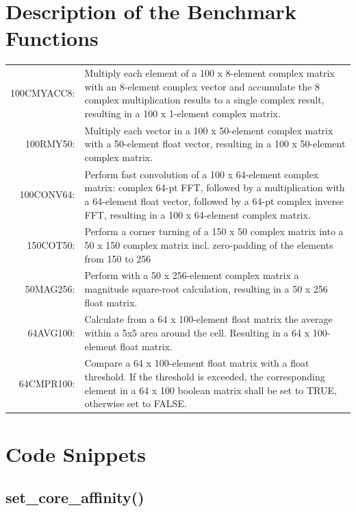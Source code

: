 \chapter{Description of the Benchmark Functions}
\label{description:benchmark}
\begin{longtable}{rp{120mm}}
	\hypertarget{benchmarks}{100CMYACC8:}& Multiply each element of a 100 x 8-element complex matrix with an 8-element complex vector and accumulate the 8 complex multiplication results to a single complex result, resulting in a 100 x 1-element complex matrix. \\[0.2cm]
	100RMY50: & Multiply each vector in a 100 x 50-element complex matrix with a 50-element float vector, resulting in a 100 x 50-element complex matrix.\\[0.2cm]
	100CONV64: & Perform fast convolution of a 100 x 64-element complex matrix: complex 64-pt FFT, followed by a multiplication with a 64-element float vector, followed by a 64-pt complex inverse FFT, resulting in a 100 x 64-element complex matrix. \\[0.2cm]
	150COT50: & Perform a corner turning of a 150 x 50 complex matrix into a 50 x 150 complex matrix incl. zero-padding of the elements from 150 to 256\\ [0.2cm]
	50MAG256: & Perform with a 50 x 256-element complex matrix a magnitude square-root calculation, resulting in a 50 x 256 float matrix. \\[0.2cm]
	64AVG100: & Calculate from a 64 x 100-element float matrix the average within a 5x5 area around the cell. Resulting in a 64 x 100-element float matrix. \\[0.2cm]
	64CMPR100: & Compare a 64 x 100-element float matrix with a float threshold. If  the threshold is exceeded, the corresponding element in a 64 x 100 boolean matrix shall be set to TRUE, otherwise set to FALSE. \\[0.2cm]
\end{longtable}
\cleardoublepage

\chapter{Code Snippets}
\label{app:code}

\section{set\_core\_affinity()}
\label{app:code:core_affinity}

